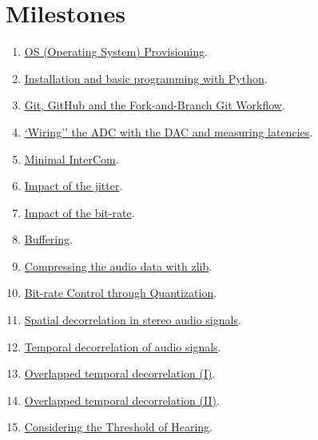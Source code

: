 \section{Milestones}
\begin{enumerate}
\item \href{https://tecnologias-multimedia.github.io/study_guide/01-provisioning/}{OS (Operating System) Provisioning}.
\item \href{https://tecnologias-multimedia.github.io/study_guide/02-python/}{Installation and basic programming with Python}.
\item \href{https://tecnologias-multimedia.github.io/study_guide/03-git/}{Git, GitHub and the Fork-and-Branch Git Workflow}.
\item \href{https://tecnologias-multimedia.github.io/study_guide/04-wiring/}{`Wiring'' the ADC with the DAC and measuring latencies}.
\item \href{https://tecnologias-multimedia.github.io/study_guide/05-minimal/}{Minimal InterCom}.
\item \href{https://tecnologias-multimedia.github.io/study_guide/06-jitter_impact/}{Impact of the jitter}.
\item \href{https://tecnologias-multimedia.github.io/study_guide/07-bit-rate_impact/}{Impact of the bit-rate}.
\item \href{https://tecnologias-multimedia.github.io/study_guide/08-buffering/}{Buffering}.
\item \href{https://tecnologias-multimedia.github.io/study_guide/09-compress/}{Compressing the audio data with zlib}.
\item \href{https://tecnologias-multimedia.github.io/study_guide/10-quantization/}{Bit-rate Control through Quantization}.
\item \href{https://tecnologias-multimedia.github.io/study_guide/11-stereo_coding/}{Spatial decorrelation in stereo audio signals}.
\item \href{https://tecnologias-multimedia.github.io/study_guide/12-temporal_decorrelation/}{Temporal decorrelation of audio signals}.
\item \href{https://tecnologias-multimedia.github.io/study_guide/13-overlapped_temporal_decorrelation_I/}{Overlapped temporal decorrelation (I)}.
\item \href{https://tecnologias-multimedia.github.io/study_guide/14-overlapped_temporal_decorrelation_II/}{Overlapped temporal decorrelation (II)}.
\item \href{https://tecnologias-multimedia.github.io/study_guide/15-threshold/}{Considering the Threshold of Hearing}.
\end{enumerate}

